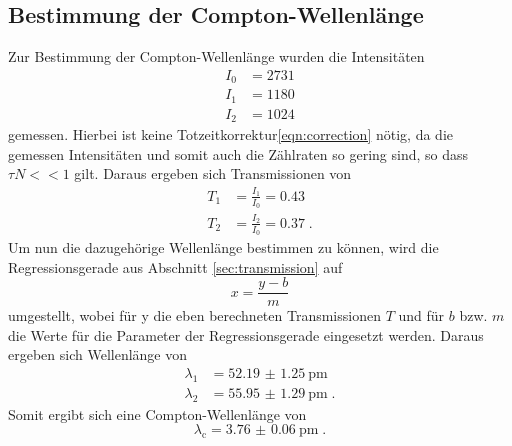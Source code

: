 \subsection{Bestimmung der Compton-Wellenlänge}
Zur Bestimmung der Compton-Wellenlänge wurden die Intensitäten 
\begin{align*}
    I_0 &= 2731\\
    I_1 &= 1180\\
    I_2 &= 1024
\end{align*}
gemessen. 
Hierbei ist keine Totzeitkorrektur\eqref{eqn:correction} nötig, da die gemessen Intensitäten und somit auch die Zählraten so gering sind,
so dass $\tau N << 1$ gilt.
Daraus ergeben sich Transmissionen von 
\begin{align*}
    T_1 &=\frac{I_1}{I_0} = 0.43 \\
    T_2 &=\frac{I_2}{I_0} = 0.37 \; \text{.}
\end{align*}
Um nun die dazugehörige Wellenlänge bestimmen zu können, wird die Regressionsgerade aus Abschnitt \ref{sec:transmission}
auf
\begin{equation*}
    x = \frac{y-b}{m}
\end{equation*}
umgestellt, wobei für y die eben berechneten Transmissionen $T$ und für $b$ bzw. $m$ die Werte für die Parameter der Regressionsgerade eingesetzt werden.
Daraus ergeben sich Wellenlänge von 
\begin{align*}
    \lambda_1 &= \SI{52.19(125)}{\pico\metre} \\
    \lambda_2 &= \SI{55.95(129)}{\pico\metre} \; \text{.}
\end{align*}
Somit ergibt sich eine Compton-Wellenlänge von 
\begin{equation*}
    \lambda_\text{c} = \SI{3.76(6)}{\pico\metre} \; \text{.}
\end{equation*}